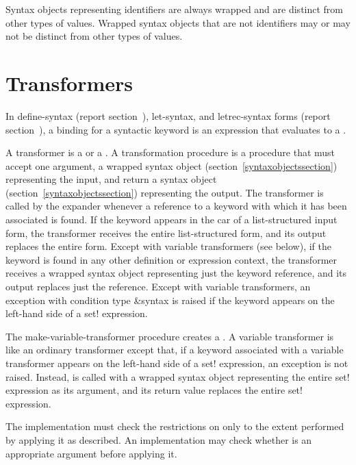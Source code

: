 Syntax objects representing identifiers are always wrapped and are distinct
from other types of values.
Wrapped syntax objects that are not identifiers may or may not be distinct
from other types of values.

\section{Transformers}
\label{transformerssection}

In {\cf define-syntax} (report
section~), {\cf
  let-syntax}, and {\cf letrec-syntax} forms (report
section~), a binding for a syntactic keyword is an expression
that evaluates to a .

A transformer is a  or a
.
A transformation procedure is a procedure that must accept one
argument, a wrapped syntax object (section~\ref{syntaxobjectssection})
representing the input, and return a syntax object
(section~\ref{syntaxobjectssection}) representing the output.
The transformer is called by the expander whenever a reference to
a keyword with which it has been associated is found.
If the keyword appears in the car of a list-structured
input form, the transformer receives the entire list-structured
form, and its output replaces the entire form.
Except with variable transformers (see below),
if the keyword is found in any other definition or expression
context, the transformer receives a wrapped syntax object representing
just the keyword reference, and its output replaces just the reference.
Except with variable transformers, an exception with condition
type {\cf\&syntax} is raised if the keyword appears on the left-hand side
of a {\cf set!} expression.

\begin{entry}{%
}


The {\cf make-variable-transformer} procedure creates a
.
A variable transformer is like an ordinary transformer except
that, if a keyword associated with a variable transformer appears on
the left-hand side of a {\cf set!} expression, an exception is
not raised.
Instead,  is called with a
wrapped syntax object representing the entire {\cf set!} expression as
its argument, and its return value replaces the entire {\cf set!}
expression.

\implresp The implementation must check the restrictions on 
only to the extent performed by applying it as described.
An
implementation may check whether  is an appropriate argument
before applying it.
\end{entry}

